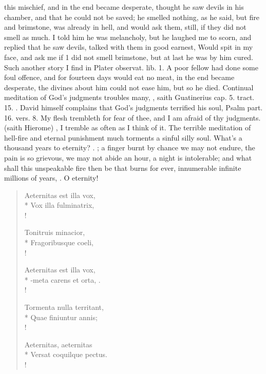 {this mischief, and in the end became desperate, thought he saw devils
in his chamber, and that he could not be saved; he smelled nothing, as
he said, but fire and brimstone, was already in hell, and would ask
them, still, if they did not smell as much. I told him he was
melancholy, but he laughed me to scorn, and replied that he saw devils,
talked with them in good earnest, Would spit in my face, and ask me if
1 did not smell brimstone, but at last he was by him cured. Such
another story I find in Plater observat. lib. 1. A poor fellow had done
some foul offence, and for fourteen days would eat no meat, in the end
became desperate, the divines about him could not ease him, but
so he died. Continual meditation of God's judgments troubles many,
, saith Guatinerius cap. 5. tract. 15.
. David himself complains that God's
judgments terrified his soul, Psalm  part. 16. vers. 8. My flesh
trembleth for fear of thee, and I am afraid of thy judgments.  (saith Hierome) , I
tremble as often as I think of it. The terrible meditation of hell-fire
and eternal punishment much torments a sinful silly soul. What's a
thousand years to eternity? . ; a finger burnt by chance
we may not endure, the pain is so grievous, we may not abide an hour, a
night is intolerable; and what shall this unspeakable fire then be that
burns for ever, innumerable infinite millions of years, . O eternity!

\begin{latin}
\begin{verse}
Aeternitas est illa vox,\\*
Vox illa fulminatrix,\\!

Tonitruis minacior,\\*
Fragoribusque coeli,\\!

Aeternitas est illa vox,\\*
-meta carens et orta, \etc{}.\\!

Tormenta nulla territant,\\*
Quae finiuntur annis;\\!

Aeternitas, aeternitas\\*
Versat coquilque pectus.\\!


\end{verse}
\end{latin}}
